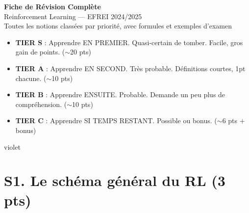 \documentclass[11pt,a4paper]{article}
\begin{document}
\begin{center}
{\Huge \textbf{Fiche de Révision Complète}}\\[0.3cm]
{\LARGE Reinforcement Learning --- EFREI 2024/2025}\\[0.4cm]
{\large Toutes les notions classées par priorité, avec formules et exemples d'examen}
\end{center}

\vspace{0.3cm}

\begin{tipbox}
\begin{itemize}[nosep]
\item \textbf{TIER S} : Apprendre EN PREMIER. Quasi-certain de tomber. Facile, gros gain de points. ($\sim$20 pts)
\item \textbf{TIER A} : Apprendre EN SECOND. Très probable. Définitions courtes, 1pt chacune. ($\sim$10 pts)
\item \textbf{TIER B} : Apprendre ENSUITE. Probable. Demande un peu plus de compréhension. ($\sim$10 pts)
\item \textbf{TIER C} : Apprendre SI TEMPS RESTANT. Possible ou bonus. ($\sim$6 pts + bonus)
\end{itemize}
\end{tipbox}

\vspace{0.3cm}

\begin{tierbox}{violet}
\end{tierbox}

\section{S1. Le schéma général du RL (3 pts)}
\end{document}
